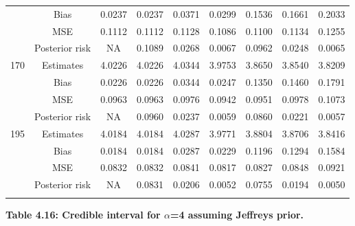 \documentclass[a4paper,12pt]{report}
\begin{document}
{\begin{minipage}{\linewidth}
{\begin{tabular}{|c|c|c|c|c|c|c|c|c|}
			&Bias           &0.0237 &0.0237 &0.0371 &0.0299 &0.1536 &0.1661 &0.2033 \\
			&MSE            &0.1112 &0.1112 &0.1128 &0.1086 &0.1100 &0.1134 &0.1255 \\
			&Posterior risk    &NA &0.1089 &0.0268 &0.0067 &0.0962 &0.0248 &0.0065 \\\hline
			170		&Estimates      &4.0226 &4.0226 &4.0344 &3.9753 &3.8650 &3.8540 &3.8209 \\
			&Bias           &0.0226 &0.0226 &0.0344 &0.0247 &0.1350 &0.1460 &0.1791 \\
			&MSE            &0.0963 &0.0963 &0.0976 &0.0942 &0.0951 &0.0978 &0.1073 \\
			&Posterior risk    &NA &0.0960 &0.0237 &0.0059 &0.0860 &0.0221 &0.0057 \\\hline
			195		&Estimates      &4.0184 &4.0184 &4.0287 &3.9771 &3.8804 &3.8706 &3.8416 \\
			&Bias           &0.0184 &0.0184 &0.0287 &0.0229 &0.1196 &0.1294 &0.1584 \\
			&MSE            &0.0832 &0.0832 &0.0841 &0.0817 &0.0827 &0.0848 &0.0921 \\
			&Posterior risk    &NA &0.0831 &0.0206 &0.0052 &0.0755 &0.0194 &0.0050 \\\hline
			\ECC
		\end{tabular}
	}
\end{minipage}

\newpage
{\noindent\small\textbf{Table 4.16: Credible interval for $\alpha$=4 assuming Jeffreys prior.}}

}
\end{document}
